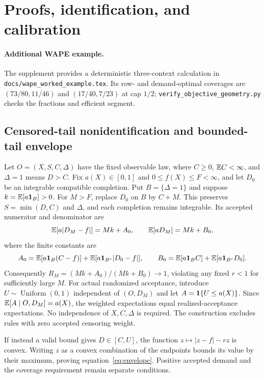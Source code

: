 \section{Proofs, identification, and calibration}
\label{app:proofs}




\paragraph{Additional WAPE example.} The supplement provides a deterministic three-context calculation in \texttt{docs/wape\_worked\_example.tex}. Its row- and demand-optimal coverages are $(73/80,11/46)$ and $(17/40,7/23)$ at cap $1/2$; \texttt{verify\_objective\_geometry.py} checks the fractions and efficient segment.

\subsection{Censored-tail nonidentification and bounded-tail envelope}
\label{app:identification}

Let $O=(X,S,C,\Delta)$ have the fixed observable law, where $C\geq0$, $\mathbb{E} C<\infty$, and $\Delta=1$ means $D>C$. Fix $a(X)\in[0,1]$ and $0\leq f(X)\leq F<\infty$, and let $D_0$ be an integrable compatible completion. Put $B=\{\Delta=1\}$ and suppose $k=\mathbb{E}[a\mathbf{1}_B]>0$. For $M>F$, replace $D_0$ on $B$ by $C+M$. This preserves $S=\min(D,C)$ and $\Delta$, and each completion remains integrable. Its accepted numerator and denominator are
\[
 \mathbb{E}[a|D_M-f|]=Mk+A_0,\qquad \mathbb{E}[aD_M]=Mk+B_0,
\]
where the finite constants are
\[
 A_0=\mathbb{E}[a\mathbf{1}_B(C-f)]+\mathbb{E}[a\mathbf{1}_{B^c}|D_0-f|],\qquad
 B_0=\mathbb{E}[a\mathbf{1}_B C]+\mathbb{E}[a\mathbf{1}_{B^c}D_0].
\]
Consequently $R_M=(Mk+A_0)/(Mk+B_0)\to1$, violating any fixed $r<1$ for sufficiently large $M$. For actual randomized acceptance, introduce $U\sim\operatorname{Uniform}(0,1)$ independent of $(O,D_M)$ and let $A=\mathbf{1}\{U\leq a(X)\}$. Since $\mathbb{E}[A\mid O,D_M]=a(X)$, the weighted expectations equal realized-acceptance expectations. No independence of $X,C,\Delta$ is required. The construction excludes rules with zero accepted censoring weight.

If instead a valid bound gives $D\in[C,U]$, the function $z\mapsto|z-f|-rz$ is convex. Writing $z$ as a convex combination of the endpoints bounds its value by their maximum, proving equation~\eqref{eq:envelope}. Positive accepted demand and the coverage requirement remain separate conditions.

